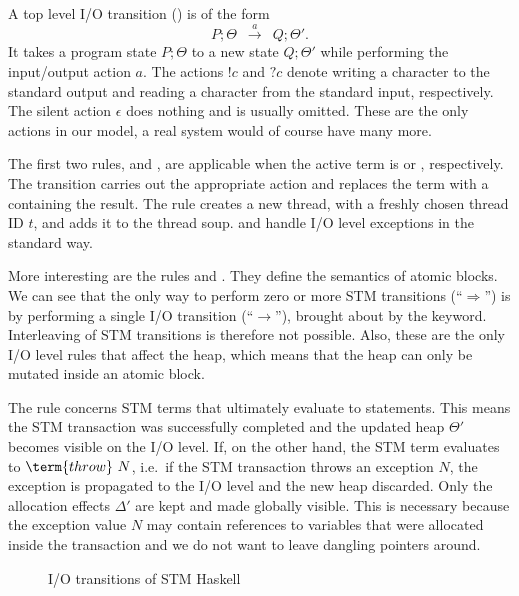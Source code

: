 A top level I/O transition () is of the form
$$P;\Theta \enspace\xrightarrow{a}\enspace Q;\Theta'.$$ 
It takes a program state $P;\Theta$ to a new state $Q;\Theta'$ while performing the input/output action $a$.
The actions $!c$ and $?c$ denote writing a character to the standard output and reading a character from the standard input, respectively.
The silent action $\epsilon$ does nothing and is usually omitted.
These are the only actions in our model, a real system would of course have many more.

The first two rules,  and , are applicable when the active term is  or , respectively.
The transition carries out the appropriate action and replaces the term with a  containing the result.
The rule  creates a new thread, with a freshly chosen thread ID $t$, and adds it to the thread soup.
 and  handle I/O level exceptions in the standard way.

More interesting are the rules  and .
They define the semantics of atomic blocks.
We can see that the only way to perform zero or more STM transitions (``$\Rightarrow$'') is by performing a single I/O transition (``$\rightarrow$''), brought about by the  keyword.
Interleaving of STM transitions is therefore not possible.
Also, these are the only I/O level rules that affect the heap, which means that the heap can only be mutated inside an atomic block.

The rule  concerns STM terms that ultimately evaluate to  statements.
This means the STM transaction was successfully completed and the updated heap $\Theta'$ becomes visible on the I/O level.
%
If, on the other hand, the STM term evaluates to $\term{throw}\ N$, i.e.\ if the STM transaction throws an exception $N$, the exception is propagated to the I/O level and the new heap discarded.
Only the allocation effects $\Delta'$ are kept and made globally visible.
This is necessary because the exception value $N$ may contain references to variables that were allocated inside the transaction and we do not want to leave dangling pointers around.


\begin{figure}[p]

\caption{I/O transitions of STM Haskell \parencite{harris-et-al-2005}}
\label{fig:orig-io}
\end{figure}

